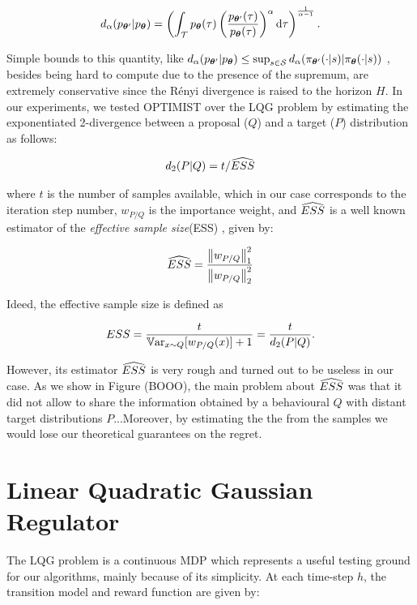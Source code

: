 \begin{align}
	d_{\alpha}(p_{\vtheta'}|p_{\vtheta}) = \left(\int_{\Tau}p_{\vtheta}(\tau)\left(\frac{p_{\vtheta'}(\tau)}{p_{\vtheta}(\tau)}\right)^{\alpha}\de \tau\right)^{\frac{1}{\alpha-1}}.
\end{align}

Simple bounds to this quantity, like $d_{\alpha}(p_{\vtheta'}|p_{\vtheta})\leq\sup_{s\in\Sspace}d_{\alpha}(\pi_{\vtheta'}(\cdot|s)|\pi_{\vtheta}(\cdot|s))$ , besides being hard to compute due to the presence of the supremum, are extremely conservative since the Rényi divergence is raised to the horizon $H$. In our experiments, we tested \gls{OPTIMIST} over the \gls{LQG} problem by estimating the exponentiated 2-\Renyi divergence between a proposal ($Q$) and a target ($P$) distribution as follows:

\begin{align}
d_{2}(P|Q)=t / \wh{ESS}
\end{align}

where $t$ is the number of samples available, which in our case corresponds to the iteration step number, $w_{P/Q}$ is the importance weight, and $\wh{ESS}$ \cite{martino2017effective} is a well known estimator of the \emph{effective sample size}(ESS) \cite{kong1992note}, given by:

\begin{align}
\wh{ESS} = \frac{\norm[1]{w_{P/Q}}^2}{\norm[2]{w_{P/Q}}^2}
\end{align}

Ideed, the effective sample size is defined as \cite{kong1992note}

\begin{align}
ESS = \frac{t}{\Var_{x\sim Q}[w_{P/Q}(x)]+1}=\frac{t}{d_{2}(P|Q)}.
\end{align}

However, its estimator $\wh{ESS}$ is very rough and turned out to be useless in our case. As we show in Figure (BOOO), the main problem about $\wh{ESS}$ was that  it did not allow to share the information obtained by a behavioural $Q$ with distant target distributions $P$...Moreover, by estimating the the \Renyi from the samples we would lose our theoretical guarantees on the regret.

\section{Linear Quadratic Gaussian Regulator}
The \gls{LQG} problem \cite{peters2008reinforcement} is a continuous \gls{MDP} which represents a useful testing ground for our algorithms, mainly because of its simplicity. At each time-step $h$, the transition model and reward function are given by:

